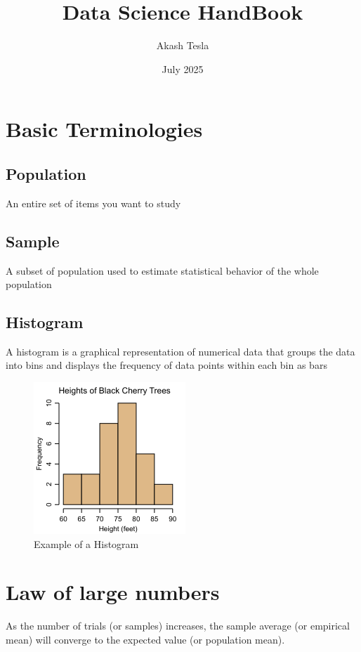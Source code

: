 \documentclass[12pt]{extarticle}
\title{Data Science HandBook}
\author{Akash Tesla}
\date{July 2025}
\begin{document}
\tableofcontents
\newpage
\maketitle
\section{Basic Terminologies}

\subsection{Population}
An entire set of items you want to study 

\subsection{Sample} 
A subset of population used to estimate statistical behavior of the whole population 

\subsection{Histogram}
A histogram is a graphical representation of numerical data that groups the data into bins and displays the frequency of data points within each bin as bars

\begin{figure}[H]
    \centering
    \includegraphics[width=0.5\linewidth]{images/histogram_example.png}
    \caption{Example of a Histogram}
    \label{fig:1}
\end{figure}


\section{Law of large numbers}
As the number of trials (or samples) increases, the sample average (or empirical mean) will converge to the expected value (or population mean).
\end{document}
